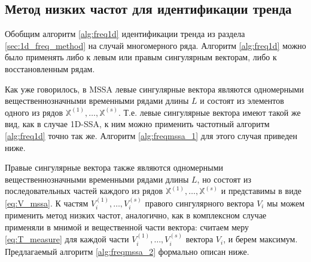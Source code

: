 \documentclass[specialist,
               substylefile = spbu.rtx,
               subf,href,colorlinks=true, 12pt]{disser}
\begin{document}
%
%

\subsection{Метод низких частот для идентификации тренда}
\label{sec:freq_method_mssa}

Обобщим алгоритм \ref{alg:freq1d} идентификации тренда из раздела \ref{sec:1d_freq_method} на случай многомерного ряда. Алгоритм \ref{alg:freq1d} можно было применять либо к левым или правым сингулярным векторам, либо к восстановленным рядам. 

Как уже говорилось, в MSSA левые сингулярные вектора являются одномерными вещественнозначными временными рядами длины $L$ и состоят из элементов одного из рядов $\mathbb{X}^{(1)}, \ldots, \mathbb{X}^{(s)}$. Т.е. левые сингулярные вектора имеют такой же вид, как в случае 1D-SSA, к ним можно применить частотный алгоритм \ref{alg:freq1d} точно так же. Алгоритм \ref{alg:freqmssa_1} для этого случая приведен ниже.

Правые сингулярные вектора также являются одномерными вещественнозначными временными рядами длины $L$, но состоят из последовательных частей каждого из рядов $\mathbb{X}^{(1)}, \ldots, \mathbb{X}^{(s)}$ и представимы в виде \eqref{eq:V_mssa}. К частям ${V}_i^{(1)}, \ldots, {V}_i^{(s)}$ правого сингулярного вектора $V_i$ мы можем применить метод низких частот, аналогично, как в комплексном случае применяли в мнимой и вещественной части вектора: считаем меру \eqref{eq:T_measure} для каждой части ${V}_i^{(1)}, \ldots, {V}_i^{(s)}$ вектора $V_i$, и берем максимум. Предлагаемый алгоритм \ref{alg:freqmssa_2} формально описан ниже.
\end{document}
